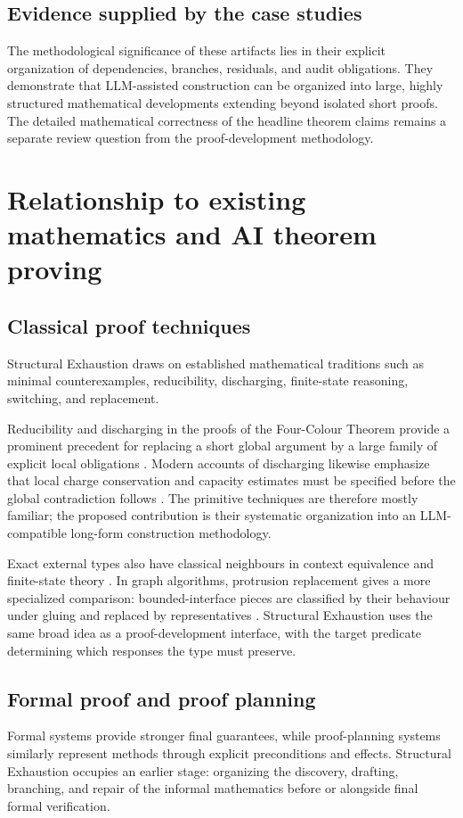 \documentclass[11pt]{article}
\begin{document}
\subsection{Evidence supplied by the case studies}
The methodological significance of these artifacts lies in their explicit organization of dependencies, branches, residuals, and audit obligations.
They demonstrate that LLM-assisted construction can be organized into large, highly structured mathematical developments extending beyond isolated short proofs.
The detailed mathematical correctness of the headline theorem claims remains a separate review question from the proof-development methodology.
\section{Relationship to existing mathematics and AI theorem proving}
\subsection{Classical proof techniques}
Structural Exhaustion draws on established mathematical traditions such as minimal counterexamples, reducibility, discharging, finite-state reasoning, switching, and replacement.

Reducibility and discharging in the proofs of the Four-Colour Theorem provide
a prominent precedent for replacing a short global argument by a large family
of explicit local obligations \citep{appel-haken-1977-discharging,
appel-haken-koch-1977-reducibility,robertson-etal-1997-four-colour}. Modern
accounts of discharging likewise emphasize that local charge conservation and
capacity estimates must be specified before the global contradiction follows
\citep{cranston-west-2017-discharging}.
The primitive techniques are therefore mostly familiar; the proposed contribution is their systematic organization into an LLM-compatible long-form construction methodology.

Exact external types also have classical neighbours in context equivalence and
finite-state theory \citep{myhill-1957-automata,nerode-1958-linear}. In graph
algorithms, protrusion replacement gives a more specialized comparison:
bounded-interface pieces are classified by their behaviour under gluing and
replaced by representatives \citep{bodlaender-etal-2009-meta-kernelization,
kim-etal-2012-protrusion}. Structural Exhaustion uses the same broad idea as a
proof-development interface, with the target predicate determining which
responses the type must preserve.
\subsection{Formal proof and proof planning}
Formal systems provide stronger final guarantees, while proof-planning systems similarly represent methods through explicit preconditions and effects.
Structural Exhaustion occupies an earlier stage: organizing the discovery, drafting, branching, and repair of the informal mathematics before or alongside final formal verification.
\end{document}
